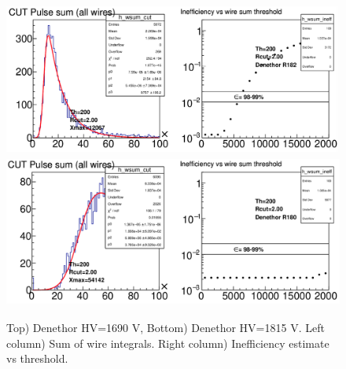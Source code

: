 \documentclass[12pt]{article}
\begin{document}
\begin{figure}[tbph]
\begin{center}
\includegraphics[height=5cm,clip=true]{Denethor_R182_HV1690_Th200_eff}
\includegraphics[height=5cm,clip=true]{Denethor_R180_HV1815_Th200_eff}
\caption{Top) Denethor HV=1690 V, Bottom) Denethor HV=1815 V. Left column) Sum of wire integrals. Right column) Inefficiency estimate vs threshold.
\label{fig:Denethor_HV1690_HV1815}}  
\end{center}
\end{figure} 
\end{document}
